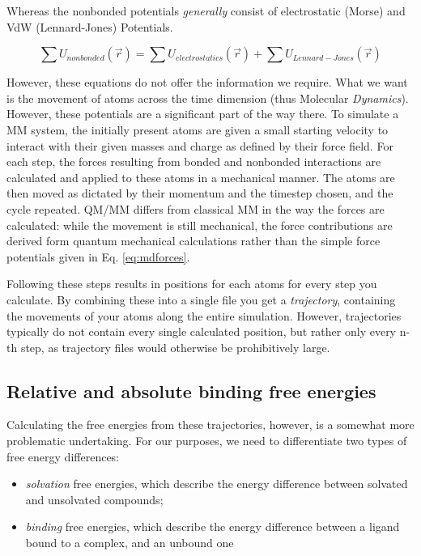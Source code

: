 \documentclass[oneside]{scrreprt}
\begin{document}
Whereas the nonbonded potentials \emph{generally} consist of electrostatic (Morse) and VdW (Lennard-Jones) Potentials.

\begin{equation}
    \sum U_{nonbonded} (\Vec{r})=\sum U_{electrostatics} (\Vec{r}) + \sum U_{Lennard-Jones} (\Vec{r})
\end{equation}


However, these equations do not offer the information we require. What we want is the movement of atoms across the time dimension (thus Molecular \emph{Dynamics}). However, these potentials are a significant part of the way there. To simulate a MM system, the initially present atoms are given a small starting velocity to interact with their given masses and charge as defined by their force field. For each step, the forces resulting from bonded and nonbonded interactions are calculated and applied to these atoms in a mechanical manner. The atoms are then moved as dictated by their momentum and the timestep chosen, and the cycle repeated. QM/MM differs from classical MM in the way the forces are calculated: while the movement is still mechanical, the force contributions are derived form quantum mechanical calculations rather than the simple force potentials given in Eq. \ref{eq:mdforces}.


Following these steps results in positions for each atoms for every step you calculate. By combining these into a single file you get a \emph{trajectory}, containing the movements of your atoms along the entire simulation. However, trajectories typically do not contain every single calculated position, but rather only every n-th step, as trajectory files would otherwise be prohibitively large.

\subsection{Relative and absolute binding free energies}

Calculating the free energies from these trajectories, however, is a somewhat more problematic undertaking. For our purposes, we need to differentiate two types of free energy differences:
\begin{itemize}
    \item \emph{solvation} free energies, which describe the energy difference between solvated and unsolvated compounds;
    \item \emph{binding} free energies, which describe the energy difference between a ligand bound to a complex, and an unbound one
\end{itemize}
\end{document}
